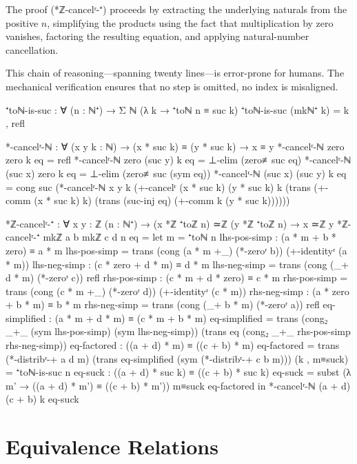 \documentclass[11pt,a4paper]{book}
\def\texttt#1{#1}%
\begin{document}
The proof (\texttt{*ℤ-cancelʳ-⁺}) proceeds by extracting the underlying naturals from 
the positive $n$, simplifying the products using the fact that multiplication by zero 
vanishes, factoring the resulting equation, and applying natural-number cancellation.

This chain of reasoning—spanning twenty lines—is error-prone for humans. The mechanical 
verification ensures that no step is omitted, no index is misaligned.

\begin{code}
⁺toℕ-is-suc : ∀ (n : ℕ⁺) → Σ ℕ (λ k → ⁺toℕ n ≡ suc k)
⁺toℕ-is-suc (mkℕ⁺ k) = k , refl

*-cancelʳ-ℕ : ∀ (x y k : ℕ) → (x * suc k) ≡ (y * suc k) → x ≡ y
*-cancelʳ-ℕ zero zero k eq = refl
*-cancelʳ-ℕ zero (suc y) k eq = ⊥-elim (zero≢suc eq)
*-cancelʳ-ℕ (suc x) zero k eq = ⊥-elim (zero≢suc (sym eq))
*-cancelʳ-ℕ (suc x) (suc y) k eq = 
  cong suc (*-cancelʳ-ℕ x y k (+-cancelʳ (x * suc k) (y * suc k) k 
    (trans (+-comm (x * suc k) k) (trans (suc-inj eq) (+-comm k (y * suc k))))))

*ℤ-cancelʳ-⁺ : ∀ {x y : ℤ} (n : ℕ⁺) → (x *ℤ ⁺toℤ n) ≃ℤ (y *ℤ ⁺toℤ n) → x ≃ℤ y
*ℤ-cancelʳ-⁺ {mkℤ a b} {mkℤ c d} n eq = 
  let m = ⁺toℕ n
      lhs-pos-simp : (a * m + b * zero) ≡ a * m
      lhs-pos-simp = trans (cong (a * m +_) (*-zeroʳ b)) (+-identityʳ (a * m))
      lhs-neg-simp : (c * zero + d * m) ≡ d * m
      lhs-neg-simp = trans (cong (_+ d * m) (*-zeroʳ c)) refl
      rhs-pos-simp : (c * m + d * zero) ≡ c * m
      rhs-pos-simp = trans (cong (c * m +_) (*-zeroʳ d)) (+-identityʳ (c * m))
      rhs-neg-simp : (a * zero + b * m) ≡ b * m
      rhs-neg-simp = trans (cong (_+ b * m) (*-zeroʳ a)) refl
      eq-simplified : (a * m + d * m) ≡ (c * m + b * m)
      eq-simplified = trans (cong₂ _+_ (sym lhs-pos-simp) (sym lhs-neg-simp))
                      (trans eq (cong₂ _+_ rhs-pos-simp rhs-neg-simp))
      eq-factored : ((a + d) * m) ≡ ((c + b) * m)
      eq-factored = trans (*-distribʳ-+ a d m) 
                    (trans eq-simplified (sym (*-distribʳ-+ c b m)))
      (k , m≡suck) = ⁺toℕ-is-suc n
      eq-suck : ((a + d) * suc k) ≡ ((c + b) * suc k)
      eq-suck = subst (λ m' → ((a + d) * m') ≡ ((c + b) * m')) m≡suck eq-factored
  in *-cancelʳ-ℕ (a + d) (c + b) k eq-suck
\end{code}

\section{Equivalence Relations}
\end{document}
